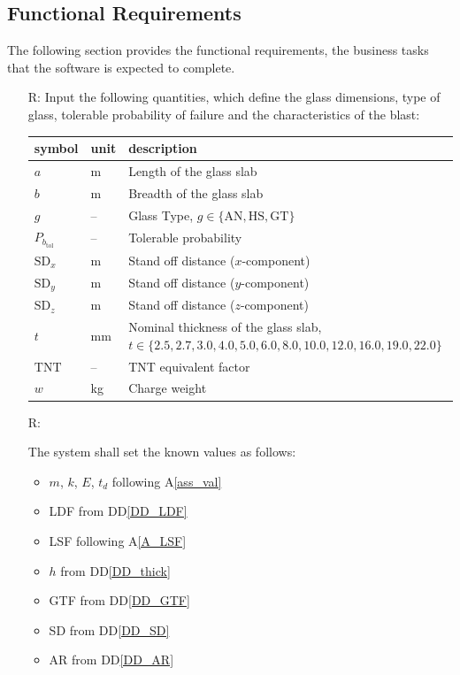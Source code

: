 \documentclass[12pt]{article}
\newcommand{\ddref}[1]{DD\ref{#1}}
\newcommand{\aref}[1]{A\ref{#1}}
\newcounter{reqnum} %
\begin{document}
\subsection{Functional Requirements} \label{Func}

The following section provides the functional requirements, the business tasks
that the software is expected to complete.

\noindent \begin{itemize}

\item[R\refstepcounter{reqnum}\thereqnum \label{Input}:] Input the following
  quantities, which define the glass dimensions, type of glass, tolerable probability of
  failure and the characteristics of the blast:

\renewcommand{\arraystretch}{1.2}
\begin{tabular}{l l p{11cm}} 
\toprule
\textbf{symbol} & \textbf{unit} & \textbf{description}\\
\midrule 
$a$ & \si{\metre}	& Length of the glass slab\\
$b$ & \si{\metre}	& Breadth of the glass slab\\
$g$ & -- & Glass Type, $g \in \{ \text{AN}, \text{HS}, \text{GT} \}$\\
$P_{b_{\text{tol}}}$ & -- & Tolerable probability\\
$\text{SD}_x$ & \si{\meter} & Stand off distance ($x$-component)\\
$\text{SD}_y$ & \si{\metre} & Stand off distance ($y$-component)\\
$\text{SD}_z$ & \si{\metre} & Stand off distance ($z$-component)\\
$t$ & \si{\milli\metre}	& Nominal thickness of the glass slab,\newline $t \in
                                  \{2.5, 2.7, 3.0, 4.0, 5.0, 6.0, 8.0, 10.0,
                                  12.0, 16.0, 19.0, 22.0\}$ \\
$\text{TNT}$ & -- & TNT equivalent factor\\
$w$ & \si{\kilo\gram}	& Charge weight\\
\bottomrule
\end{tabular}

\item [R\refstepcounter{reqnum}\thereqnum \label{KnownValues}:]

The system shall set the known values as follows:
\begin{itemize}
\item $m$, $k$, $E$, $t_d$ following \aref{ass_val}
\item LDF from \ddref{DD_LDF}
\item LSF following \aref{A_LSF}
\item $h$ from \ddref{DD_thick}
\item GTF from \ddref{DD_GTF}
\item SD from \ddref{DD_SD}
\item AR from \ddref{DD_AR}
\end{itemize}


\end{itemize}
\end{document}
